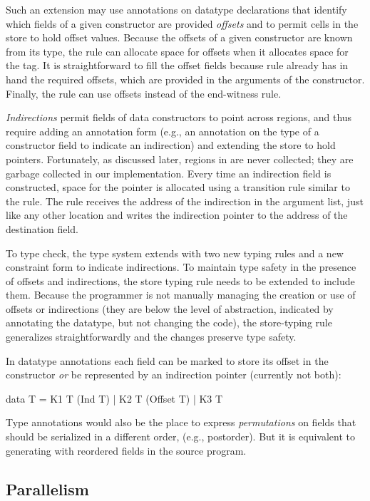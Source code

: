Such an extension may use annotations on datatype declarations
that identify which fields of a given constructor are provided \emph{offsets}
and to permit cells in the store to hold offset values.
%
Because the offsets of a given constructor are known from its type,
the \textsc{\dletloctag{}} rule can allocate space for offsets when it
allocates space for the tag.
%
It is straightforward to fill the offset fields because \textsc{\ddatacon{}}
rule already has in hand the required offsets, which are provided in
the arguments of the constructor.
%
Finally, the \textsc{\dcase{}} rule can use offsets instead of
the end-witness rule.

\emph{Indirections} permit fields of data constructors to point across
regions, and thus require adding an annotation form (e.g., an
annotation on the type of a constructor field to indicate an
indirection) and extending the store to hold pointers.
%
Fortunately, as discussed later, regions in \ourcalc{} are never
collected; they are garbage collected in our implementation.
%
Every time an indirection field is constructed, space for the pointer
is allocated using a transition rule similar to the \textsc{\dletloctag{}}
rule.
%
The \textsc{\ddatacon{}} rule receives the address of the indirection in the
argument list, just like any other location and writes the indirection
pointer to the address of the destination field.
%

To type check, the type system extends with two new typing rules and a
new constraint form to indicate indirections.
%
To maintain type safety in the presence of offsets and indirections,
the store typing rule needs to be extended to include them.
%
Because the programmer is not manually managing the creation or use of offsets
or indirections (they are below the level of abstraction, indicated by
annotating the datatype, but not changing the code), the store-typing rule
generalizes straightforwardly and the changes preserve type safety.

In datatype annotations each field can be marked to store its offset in the constructor {\em
  or} be represented by an indirection pointer (currently not both):
\begin{code}
data T = K1 T (Ind T) | K2 T (Offset T) | K3 T
\end{code}
Type annotations would also be the place to express {\em permutations} on fields
that should be serialized in a different order, (e.g., postorder).  But it is
equivalent to generating \ourcalc with reordered fields in the source program.

\subsection{Parallelism}\label{subsec:parallelism}

